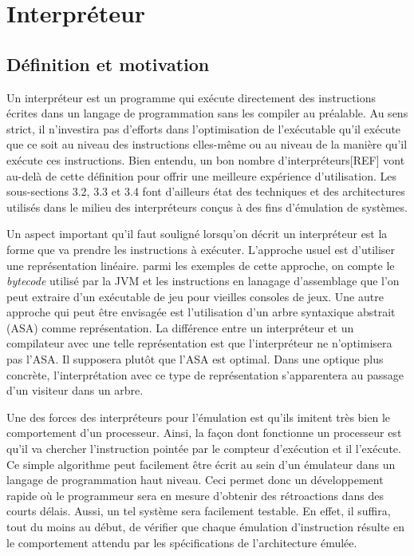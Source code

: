 \documentclass{article} %
\begin{document}
\section{Interpréteur}
\subsection{Définition et motivation}
Un interpréteur est un programme qui exécute directement des instructions écrites dans un langage de programmation sans les compiler au préalable. Au sens strict, il n'investira pas d'efforts dans l'optimisation de l'exécutable qu'il exécute que ce soit au niveau des instructions elles-même ou au niveau de la manière qu'il exécute ces instructions. Bien entendu, un bon nombre d'interpréteurs[REF] vont au-delà de cette définition  pour offrir une meilleure expérience d'utilisation. Les sous-sections 
3.2, 3.3 et 3.4 font d'ailleurs état des techniques et des architectures utilisés dans le milieu des interpréteurs conçus à des fins d'émulation de systèmes.

Un aspect important qu'il faut souligné lorsqu'on décrit un interpréteur est la forme que va prendre les instructions à exécuter. L'approche usuel est d'utiliser une représentation linéaire. parmi les exemples de cette approche, on compte le \textit{bytecode} utilisé par la JVM et les instructions en lanagage d'assemblage que l'on peut extraire d'un exécutable de jeu pour vieilles consoles de jeux. Une autre approche qui peut être envisagée est l'utilisation d'un arbre syntaxique abstrait (ASA) comme représentation. La différence entre un interpréteur et un compilateur avec une telle représentation est que l'interpréteur ne n'optimisera pas l'ASA. Il supposera plutôt que l'ASA est optimal. Dans une optique plus concrète, l'interprétation avec ce type de représentation s'apparentera au passage d'un visiteur dans un arbre.

Une des forces des interpréteurs pour l'émulation est qu'ils imitent très bien le comportement d'un processeur. Ainsi, la façon dont fonctionne un processeur est qu'il va chercher l'instruction pointée par le compteur d'exécution et il l'exécute. Ce simple algorithme peut facilement être écrit au sein d'un émulateur dans un langage de programmation haut niveau. Ceci permet donc un développement rapide où le programmeur sera en mesure d'obtenir des rétroactions dans des courts délais. Aussi, un tel système sera facilement testable. En effet, il suffira, tout du moins au début, de vérifier que chaque émulation d'instruction résulte en le comportement attendu par les spécifications de l'architecture émulée.
\end{document}
